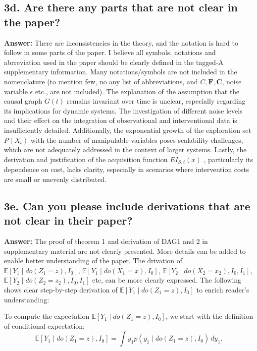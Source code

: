 \documentclass[a4paper,10pt]{article}
\begin{document}
\subsection*{3d. Are there any parts that are not clear in the paper?}

\textbf{Answer:} There are inconsistencies in the theory, and the notation is hard to follow in some parts of the paper. I believe all symbols, notations and abrreviation used in the paper should be clearly defined in the tagged-A supplementary information. Many notations/symbols are not included in the nomenclature (to mention few, no any list of abbreviations, and $C, \mathbf{F}, \mathbf{C}$, noise variable $\epsilon$ etc., are not included). The explanation of the assumption that the causal graph $G(t)$ remains invariant over time is unclear, especially regarding its implications for dynamic systems. The investigation of different noise levels and their effect on the integration of observational and interventional data is insufficiently detailed. Additionally, the exponential growth of the exploration set $P(X_t)$ with the number of manipulable variables poses scalability challenges, which are not adequately addressed in the context of larger systems. Lastly, the derivation and justification of the acquisition function $EI_{S,t}(x)$ , particularly its dependence on cost, lacks clarity, especially in scenarios where intervention costs are small or unevenly distributed.

\subsection*{3e. Can you please include derivations that are not clear in their paper?}


\textbf{Answer:} The proof of theorem 1 and derivation of DAG1 and 2 in supplementary material are not clearly presented. More details can be added to enable better understanding of the paper. The drivation of $\mathbb{E}[Y_1 \mid do(Z_1 = z), I_0]$, $\mathbb{E}[Y_1 \mid do(X_1 = x), I_0]$, $\mathbb{E}[Y_2 \mid do(X_2 = x_2), I_0, I_1]$, $\mathbb{E}[Y_2 \mid do(Z_2 = z_2), I_0, I_1]$ etc, can be more clearly expressed. The following shows clear step-by-step derivation of $\mathbb{E}[Y_1 \mid do(Z_1 = z), I_0]$ to enrich reader's understanding:

To compute the expectation \(\mathbb{E}[Y_1 \mid do(Z_1 = z), I_0]\), we start with the definition of conditional expectation:
\[
\mathbb{E}[Y_1 \mid do(Z_1 = z), I_0] = \int y_1 p(y_1 \mid do(Z_1 = z), I_0) \, dy_1.
\]
\end{document}
